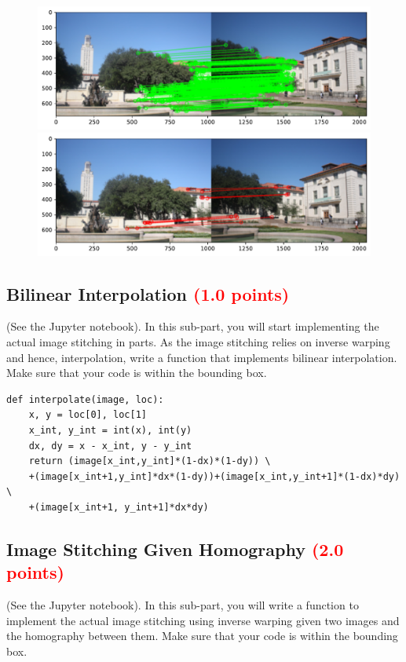 \documentclass[answers]{exam}
\newcommand{\mypoints}[1]{\textcolor{red}{(#1 points)}}
\begin{document}
\begin{solution}
\begin{figure}[H]
    \centering
    \includegraphics[width=\linewidth]{Images/question_3_8_inliers.pdf}
    \includegraphics[width=\linewidth]{Images/question_3_8_outliers.pdf}
\end{figure}
\end{solution}

\subsection{Bilinear Interpolation \mypoints{1.0}}
(See the Jupyter notebook). In this sub-part, you will start implementing the actual image stitching in parts. As the image stitching relies on inverse warping and hence, interpolation, write a function that implements bilinear interpolation. Make sure that your code is within the bounding box.

\begin{solution}
\begin{verbatim}
def interpolate(image, loc):
    x, y = loc[0], loc[1]
    x_int, y_int = int(x), int(y)
    dx, dy = x - x_int, y - y_int
    return (image[x_int,y_int]*(1-dx)*(1-dy)) \ 
    +(image[x_int+1,y_int]*dx*(1-dy))+(image[x_int,y_int+1]*(1-dx)*dy) \ 
    +(image[x_int+1, y_int+1]*dx*dy)
\end{verbatim}
\end{solution}

\subsection{Image Stitching Given Homography \mypoints{2.0}}
(See the Jupyter notebook). In this sub-part, you will  write a function to implement the actual image stitching using inverse warping given two images and the homography between them. Make sure that your code is within the bounding box.
\end{document}

